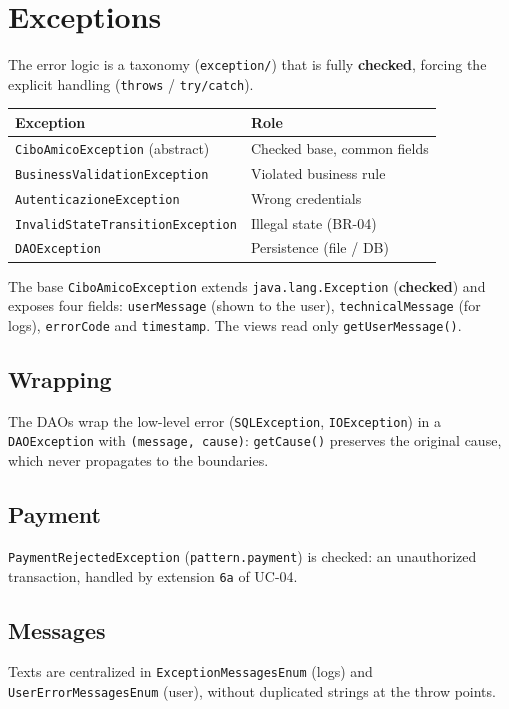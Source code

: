 \chapter{Exceptions}
\label{cap:exceptions}

The error logic is a taxonomy (\texttt{exception/}) that is fully
\textbf{checked}, forcing the explicit handling (\texttt{throws} /
\texttt{try/catch}).

\begin{center}
\begin{tabular}{@{}ll@{}}
\toprule
\textbf{Exception} & \textbf{Role} \\
\midrule
\texttt{CiboAmicoException} (abstract) & Checked base, common fields \\
\texttt{BusinessValidationException} & Violated business rule \\
\quad\texttt{AutenticazioneException} & Wrong credentials \\
\quad\texttt{InvalidStateTransitionException} & Illegal state (BR-04) \\
\texttt{DAOException} & Persistence (file / DB) \\
\bottomrule
\end{tabular}
\end{center}

The base \texttt{CiboAmicoException} extends \texttt{java.lang.Exception}
(\textbf{checked}) and exposes four fields: \texttt{userMessage} (shown to the
user), \texttt{technicalMessage} (for logs), \texttt{errorCode} and
\texttt{timestamp}. The views read only \texttt{getUserMessage()}.

\section{Wrapping}
\label{sec:exc_wrapping}

The DAOs wrap the low-level error (\texttt{SQLException},
\texttt{IOException}) in a \texttt{DAOException} with
\texttt{(message, cause)}: \texttt{getCause()} preserves the original cause,
which never propagates to the boundaries.

\section{Payment}
\label{sec:exc_payment}

\texttt{PaymentRejectedException} (\texttt{pattern.payment}) is checked:
an unauthorized transaction, handled by extension \texttt{6a} of UC-04.

\section{Messages}
\label{sec:exc_messaggi}

Texts are centralized in \texttt{ExceptionMessagesEnum} (logs) and
\texttt{UserErrorMessagesEnum} (user), without duplicated strings at the
throw points.
